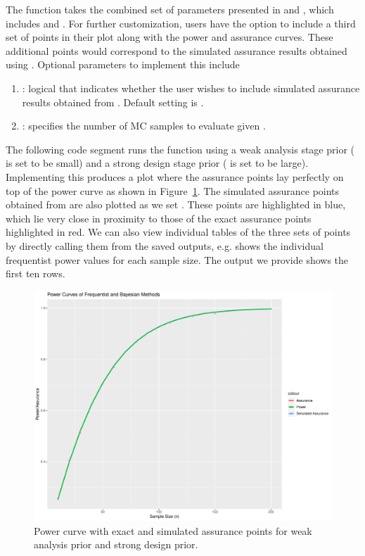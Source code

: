 The  function takes the combined set of
parameters presented in  and ,
which includes  and
. For further customization, users have the option to
include a third set of points in their plot along with the power and
assurance curves. These additional points would correspond to the
simulated assurance results obtained using .
Optional parameters to implement this include 
\begin{enumerate}
	\item{: logical that indicates whether the 
	user wishes to include simulated assurance results obtained
	from .  Default setting is
	 .}
	\item{: specifies the number of MC samples 
	to evaluate given .}
\end{enumerate}
The following code segment runs the  function 
using a weak analysis stage prior ( is
set to be small) and a strong design stage prior ( is
set to be large). Implementing this produces a plot where the
assurance points lay perfectly on top of the power curve as
shown in Figure~\ref{fig:pwr_curve_ex1}. The simulated assurance
points obtained from  are also plotted as we set
. These points are highlighted in blue, which 
lie very close in proximity to those of the exact
assurance points highlighted in red. 
We can also view individual tables of the three sets of 
points by directly calling them from the saved outputs, e.g.
 shows the individual frequentist
power values for each sample size. The output we provide
shows the first ten rows. 

\begin{figure}[t!]
\centering
\includegraphics[width = 10 cm]{pwr_curve_ex1.pdf}
\caption{\label{fig:pwr_curve_ex1} Power curve with exact and simulated
assurance points for weak analysis prior and strong design prior.}
\end{figure}


